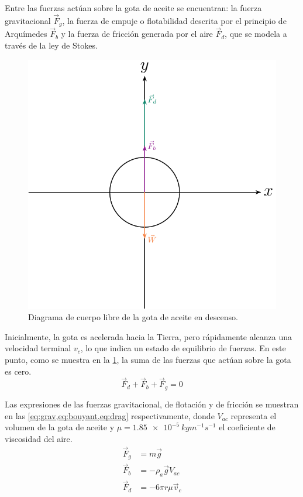 Entre las fuerzas actúan sobre la gota de aceite se encuentran: la fuerza
gravitacional $\vec{F}_g$, la fuerza de empuje o flotabilidad descrita
por el principio de Arquímedes $\vec{F}_b$ y la fuerza de fricción generada
por el aire $\vec{F}_d$, que se modela a través de la ley de Stokes.

\begin{figure}[htbp!]
    \centering
    \includegraphics[width=0.8\linewidth]{./images/free-body-diagram-falling.pdf}
    \caption{Diagrama de cuerpo libre de la gota de aceite en descenso.}
    \label{fig:fbd-falling-drop}
\end{figure}

Inicialmente, la gota es acelerada hacia la Tierra, pero rápidamente
alcanza una velocidad terminal $v_{c}$, lo que indica un estado de equilibrio de fuerzas.
En este punto, como se muestra en la \cref{fig:fbd-falling-drop}, la suma de
las fuerzas que actúan sobre la gota es cero.
\begin{equation}\label{eq:equilibrium-1}
    \vec{F}_d + \vec{F}_b + \vec{F}_g = 0
\end{equation}

Las expresiones de las fuerzas gravitacional, de flotación y de fricción se
muestran en las \cref{eq:grav,eq:bouyant,eq:drag} respectivamente, donde
\( V_{ac} \) representa el volumen de la gota de aceite y
\( \mu = \qty{1.85e-5}{kgm^{-1}s^{-1}} \) el coeficiente de viscosidad del aire.
\begin{align}
    \vec{F}_g &= m\vec{g} \label{eq:grav} \\
    \vec{F}_b &= -\rho_a \vec{g}V_{ac} \label{eq:bouyant} \\
    \vec{F}_d &= -6\pi r\mu \vec{v}_c \label{eq:drag}
\end{align}

